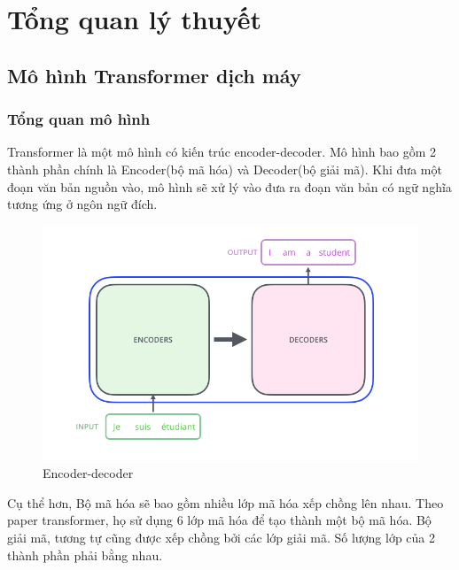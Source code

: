 \chapter{Tổng quan lý thuyết}
\label{Chapter2}
\section{Mô hình Transformer dịch máy}

\subsection{Tổng quan mô hình}

Transformer là một mô hình có kiến trúc encoder-decoder. Mô hình bao gồm 2 thành phần chính là Encoder(bộ mã hóa) và Decoder(bộ giải mã). Khi đưa một đoạn văn bản nguồn vào, mô hình sẽ xử lý vào đưa ra đoạn văn bản có ngữ nghĩa tương ứng ở ngôn ngữ đích.

\begin{figure}[H]
    \begin{center}
        \includegraphics[scale=0.4]{images/The_transformer_encoders_decoders}
        \caption{Encoder-decoder}
        \label{fig:encoder-decoder}
    \end{center}
\end{figure}

Cụ thể hơn, Bộ mã hóa sẽ bao gồm nhiều lớp mã hóa xếp chồng lên nhau. Theo paper transformer, họ sử dụng 6 lớp mã hóa để tạo thành một bộ mã hóa.  Bộ giải mã, tương tự cũng được xếp chồng bởi các lớp giải mã. Số lượng lớp của 2 thành phần phải bằng nhau.

